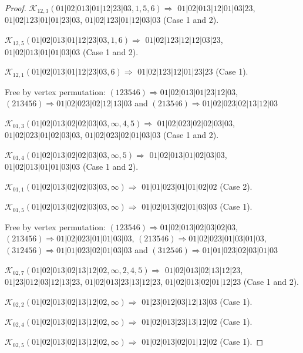 \documentclass[12pt]{article}
\theoremstyle{plain}
\theoremstyle{definition}
\theoremstyle{remark}
\newcommand{\fancy}[1]{\mathcal{#1}}
\def\K{\fancy{K}}
\begin{document}
\begin{proof}
	
	
	\bigskip
	
	$\K_{12,3}(01|02|013|01|12|23|03,1, 5, 6)\Rightarrow $ $01|02|013|12|01|03|23$, $01|02|123|01|01|23|03$, $01|02|123|01|12|03|03$ (Case 1 and 2).
	
	$\K_{12,5}(01|02|013|01|12|23|03,1, 6)\Rightarrow $ $01|02|123|12|12|03|23$, $01|02|013|01|01|03|03$ (Case 1 and 2).
	
	$\K_{12,1}(01|02|013|01|12|23|03,6)\Rightarrow $ $01|02|123|12|01|23|23$ (Case 1).
	
	
	
	Free by vertex permutation: $(1 2 3 5 4 6)\Rightarrow 01|02|013|01|23|12|03$, $(2 1 3 4 5 6)\Rightarrow 01|02|023|02|12|13|03$ and $(2 1 3 5 4 6)\Rightarrow 01|02|023|02|13|12|03$
	
	
	
	\bigskip
	
	$\K_{01,3}(01|02|013|02|02|03|03,\infty,4, 5)\Rightarrow $ $01|02|023|02|02|03|03$, $01|02|023|01|02|03|03$, $01|02|023|02|01|03|03$ (Case 1 and 2).
	
	$\K_{01,4}(01|02|013|02|02|03|03,\infty,5)\Rightarrow $ $01|02|013|01|02|03|03$, $01|02|013|01|01|03|03$ (Case 1 and 2).
	
	$\K_{01,1}(01|02|013|02|02|03|03,\infty)\Rightarrow $ $01|01|023|01|01|02|02$ (Case 2).
	
	$\K_{01,5}(01|02|013|02|02|03|03,\infty)\Rightarrow $ $01|02|013|02|01|03|03$ (Case 1).
	
	
	
	Free by vertex permutation: $(1 2 3 5 4 6)\Rightarrow 01|02|013|02|03|02|03$, $(2 1 3 4 5 6)\Rightarrow 01|02|023|01|01|03|03$, $(2 1 3 5 4 6)\Rightarrow 01|02|023|01|03|01|03$, $(3 1 2 4 5 6)\Rightarrow 01|01|023|02|01|03|03$ and $(3 1 2 5 4 6)\Rightarrow 01|01|023|02|03|01|03$
	
	
	
	\bigskip
	
	$\K_{02,7}(01|02|013|02|13|12|02,\infty,2, 4, 5)\Rightarrow $ $01|02|013|02|13|12|23$, $01|23|012|03|12|13|23$, $01|02|013|23|13|12|23$, $01|02|013|02|01|12|23$ (Case 1 and 2).
	
	$\K_{02,2}(01|02|013|02|13|12|02,\infty)\Rightarrow $ $01|23|012|03|12|13|03$ (Case 1).
	
	$\K_{02,4}(01|02|013|02|13|12|02,\infty)\Rightarrow $ $01|02|013|23|13|12|02$ (Case 1).
	
	$\K_{02,5}(01|02|013|02|13|12|02,\infty)\Rightarrow $ $01|02|013|02|01|12|02$ (Case 1).
	

\end{proof}
\end{document}
